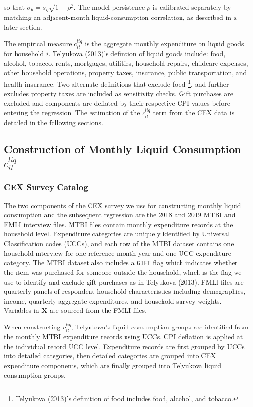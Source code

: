 \documentclass[11pt]{article}
\begin{document}
so that $\sigma_\theta=s_\eta\sqrt{1-\rho^2}$. The model persistence $\rho$ is calibrated separately by matching an adjacent-month liquid-consumption correlation, as described in a later section.

The empirical measure $c^{liq}_{it}$ is the aggregate monthly expenditure on liquid goods for household $i$. Telyukova (2013)'s defintion of liquid goods include: food, alcohol, tobacco, rents, mortgages, utilities, household repairs, childcare expenses, other household operations, property taxes, insurance, public transportation, and health insurance. Two alternate definitions that exclude food \footnote{Telyukova (2013)'s definition of food includes food, alcohol, and tobacco.}, and further excludes property taxes are included as sensitivity checks. Gift purchases are excluded and components are deflated by their respective CPI values before entering the regression. The estimation of the $c^{liq}_{it}$ term from the CEX data is detailed in the following sections. 

\subsection{Construction of Monthly Liquid Consumption $c^{liq}_{it}$}



\subsubsection{CEX Survey Catalog}

The two components of the CEX survey we use for constructing monthly liquid consumption and the subsequent regression are the 2018 and 2019 MTBI and FMLI interview files. MTBI files contain monthly expenditure records at the household level. Expenditure categories are uniquely identified by Universal Classification codes (UCCs), and each row of the MTBI dataset contains one household interview for one reference month-year and one UCC expenditure category. The MTBI dataset also includes a \lstinline|GIFT| flag which indicates whether the item was purchased for someone outside the household, which is the flag we use to identify and exclude gift purchases as in Telyukova (2013). FMLI files are quarterly panels of respondent household characteristics including demographics, income, quarterly aggregate expenditures, and household survey weights. Variables in $\textbf{X}$ are sourced from the FMLI files. 

When constructing  $c^{liq}_{it}$, Telyukova's liquid consumption groups are identified from the monthly MTBI expenditure records using UCCs. CPI deflation is applied at the individual record UCC level. Expenditure records are first grouped by UCCs into detailed categories, then detailed categories are grouped into CEX expenditure components, which are finally grouped into Telyukova liquid consumption groups. 
\end{document}
